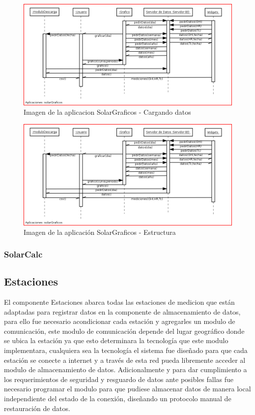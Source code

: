 {\begin{figure}[h!]
        \centering
        \includegraphics[scale=0.4]{images/graficosSecuencia}
        \caption{Imagen de la aplicacion SolarGraficos - Cargando datos}
        \label{solarGraficoFoto1}
\end{figure}
\begin{figure}[h!]
        \centering
        \includegraphics[scale=0.4]{images/graficosSecuencia}
        \caption{Imagen de la aplicación SolarGraficos - Estructura}
        \label{solarGraficoFoto2}
\end{figure}

\subsubsection{SolarCalc}

\subsection{Estaciones}
El componente Estaciones abarca todas las estaciones de medicion que están adaptadas para registrar datos en la componente de almacenamiento de datos, para ello fue necesario acondicionar cada estación y agregarles un modulo de comunicación, este modulo de comunicación depende del lugar geográfico donde se ubica la estación ya que esto determinara la tecnología que este modulo implementara, cualquiera sea la tecnología el sistema fue diseñado para que cada estación se conecte a internet y a través de esta red pueda libremente acceder al modulo de almacenamiento de datos. Adicionalmente y para dar cumplimiento a los requerimientos de seguridad y resguardo de datos ante posibles fallas fue necesario programar el modulo para que pudiese almacenar datos de manera local independiente del estado de la conexión, diseñando un protocolo manual de restauración de datos.

}
